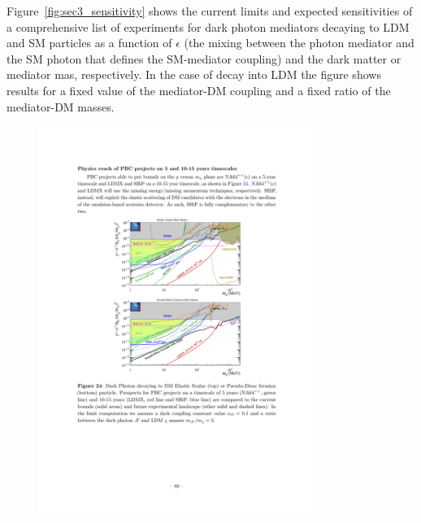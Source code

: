 \documentclass[../report.tex]{subfiles}
\begin{document}
Figure~\ref{fig:sec3_sensitivity} shows
the current limits and expected sensitivities of a comprehensive list of experiments for dark photon mediators decaying to LDM and SM particles as a function of $\epsilon$ (the mixing between the photon mediator and the SM photon that defines the SM-mediator coupling) and the dark matter or mediator mas, respectively. In the case of decay into LDM the figure shows results for a fixed value of the mediator-DM coupling and a fixed ratio of the mediator-DM masses. 

\begin{figure}
    \centering
    \includegraphics[width=0.8\textwidth]{Darkmatter/section3/pbc_bc2.pdf}

\end{figure}
\end{document}
